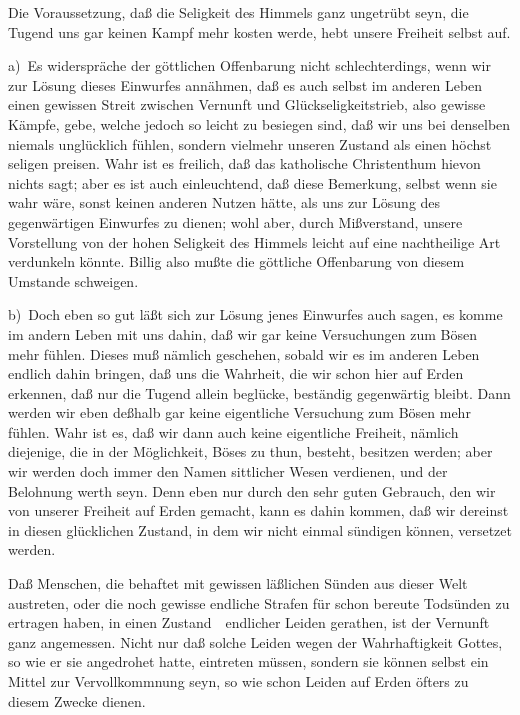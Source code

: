 \begin{aufza}
\begin{aufzb}
\begin{aufzc}
\item {} Die Voraussetzung, daß die Seligkeit des Himmels ganz ungetrübt seyn, die Tugend uns gar keinen Kampf mehr kosten werde, hebt unsere Freiheit selbst auf.\par
{} a)~Es widerspräche der göttlichen Offenbarung nicht schlechterdings, wenn wir zur Lösung dieses Einwurfes annähmen, daß es auch selbst im anderen Leben einen gewissen Streit zwischen Vernunft und Glückseligkeitstrieb, also gewisse Kämpfe, gebe, welche jedoch so leicht zu besiegen sind, daß wir uns bei denselben niemals unglücklich fühlen, sondern vielmehr unseren Zustand als einen höchst seligen preisen. Wahr ist es freilich, daß das katholische Christenthum hievon nichts sagt; aber es ist auch einleuchtend, daß diese Bemerkung, selbst wenn sie wahr wäre, sonst keinen anderen Nutzen hätte, als uns zur Lösung des gegenwärtigen Einwurfes zu dienen; wohl aber, durch Mißverstand, unsere Vorstellung von der hohen Seligkeit des Himmels leicht auf eine nachtheilige Art verdunkeln könnte. Billig also mußte die göttliche Offenbarung von diesem Umstande schweigen.\par
b)~Doch eben so gut läßt sich zur Lösung jenes Einwurfes auch sagen, es komme im andern Leben mit uns dahin, daß wir gar keine Versuchungen zum Bösen mehr fühlen. Dieses muß nämlich geschehen, sobald wir es im anderen Leben endlich dahin bringen, daß uns die Wahrheit, die wir schon hier auf Erden erkennen, daß nur die Tugend allein beglücke, beständig gegenwärtig bleibt. Dann werden wir eben deßhalb gar keine eigentliche Versuchung zum Bösen mehr fühlen. Wahr ist es, daß wir dann auch keine eigentliche Freiheit, nämlich diejenige, die in der Möglichkeit, Böses zu thun, besteht, besitzen werden; aber wir werden doch immer den Namen sittlicher Wesen verdienen, und der Belohnung werth seyn. Denn eben nur durch den sehr guten Gebrauch, den wir von unserer Freiheit auf Erden gemacht, kann es dahin kommen, daß wir dereinst in diesen glücklichen Zustand, in dem wir nicht einmal sündigen können, versetzet werden.
\end{aufzc}
\item {} Daß Menschen, die behaftet mit gewissen läßlichen Sünden aus dieser Welt austreten, oder die noch gewisse endliche Strafen für schon bereute Todsünden zu ertragen haben, in einen Zustand~\ endlicher Leiden gerathen, ist der Vernunft ganz angemessen. Nicht nur daß solche Leiden wegen der Wahrhaftigkeit Gottes, so wie er sie angedrohet hatte, eintreten müssen, sondern sie können selbst ein Mittel zur Vervollkommnung seyn, so wie schon Leiden auf Erden öfters zu diesem Zwecke dienen.

\end{aufzb}
\end{aufza}
